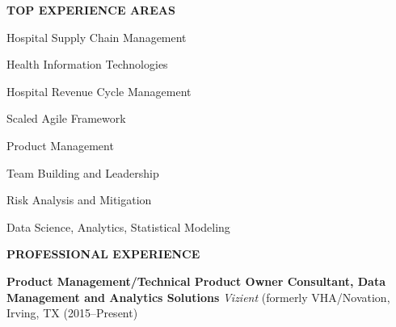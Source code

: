 \documentclass{article}
\newcommand{\sbt}{\,\begin{picture}(-1,1)(-1,-3)\circle*{3}\end{picture}\ }
\newenvironment{tightcenter}{%
  \setlength\topsep{0pt}
  \setlength\parskip{10pt}
  \begin{center}
}{%
  \end{center}
}
\begin{document}
\begin{tightcenter}
{\bfseries \large TOP EXPERIENCE AREAS}
\end{tightcenter}

\begin{minipage}[t]{0.4\textwidth}
\begin{compactitem}
\item[\sbt] Hospital Supply Chain Management
\item[\sbt] Health Information Technologies
\item[\sbt] Hospital Revenue Cycle Management
\item[\sbt] Scaled Agile Framework
\end{compactitem}
\end{minipage}
\begin{minipage}[t]{0.6\textwidth}
\begin{compactitem}
\item[\sbt] Product Management
\item[\sbt] Team Building and Leadership
\item[\sbt] Risk Analysis and Mitigation
\item[\sbt] Data Science, Analytics, Statistical Modeling

\end{compactitem}
\end{minipage}

\begin{tightcenter}
{\bfseries \large PROFESSIONAL EXPERIENCE}
\end{tightcenter}

\noindent
{\bfseries Product Management/Technical Product Owner Consultant, Data Management and Analytics Solutions} {\itshape Vizient} (formerly VHA/Novation, Irving, TX (2015--Present)
\end{document}
